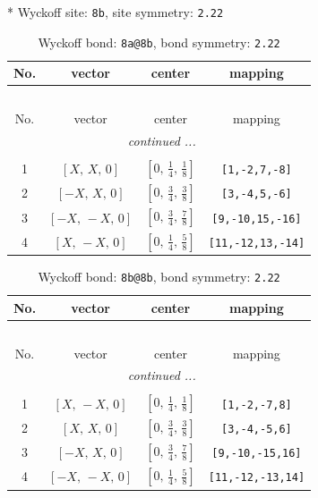 \documentclass[fleqn,8pt]{jsarticle}
\begin{document}
* Wyckoff site: {\tt 8b}, site symmetry: {\tt 2.22}
\renewcommand{\arraystretch}{1.2}
\begin{longtable}{cccc}
\caption{Wyckoff bond: {\tt 8a@8b}, bond symmetry: {\tt 2.22}}
 \\
 \hline \hline
No. & vector & center & mapping \\ \hline \endfirsthead

\multicolumn{3}{l}{\tablename\ \thetable{}} \\
 \hline \hline
No. & vector & center & mapping \\ \hline \endhead

 \hline \hline
\multicolumn{3}{r}{\footnotesize\it continued ...} \\ \endfoot

 \hline \hline
\multicolumn{3}{r}{} \\ \endlastfoot

1 & $\left[ X,\, X,\, 0 \right]$ & $\left[ 0,\, \frac{1}{4},\, \frac{1}{8} \right]$ & {\tt [1,-2,7,-8]} \\ \hline
2 & $\left[ - X,\, X,\, 0 \right]$ & $\left[ 0,\, \frac{3}{4},\, \frac{3}{8} \right]$ & {\tt [3,-4,5,-6]} \\ \hline
3 & $\left[ - X,\, - X,\, 0 \right]$ & $\left[ 0,\, \frac{3}{4},\, \frac{7}{8} \right]$ & {\tt [9,-10,15,-16]} \\ \hline
4 & $\left[ X,\, - X,\, 0 \right]$ & $\left[ 0,\, \frac{1}{4},\, \frac{5}{8} \right]$ & {\tt [11,-12,13,-14]} \\
\end{longtable}
\renewcommand{\arraystretch}{1.2}
\begin{longtable}{cccc}
\caption{Wyckoff bond: {\tt 8b@8b}, bond symmetry: {\tt 2.22}}
 \\
 \hline \hline
No. & vector & center & mapping \\ \hline \endfirsthead

\multicolumn{3}{l}{\tablename\ \thetable{}} \\
 \hline \hline
No. & vector & center & mapping \\ \hline \endhead

 \hline \hline
\multicolumn{3}{r}{\footnotesize\it continued ...} \\ \endfoot

 \hline \hline
\multicolumn{3}{r}{} \\ \endlastfoot

1 & $\left[ X,\, - X,\, 0 \right]$ & $\left[ 0,\, \frac{1}{4},\, \frac{1}{8} \right]$ & {\tt [1,-2,-7,8]} \\ \hline
2 & $\left[ X,\, X,\, 0 \right]$ & $\left[ 0,\, \frac{3}{4},\, \frac{3}{8} \right]$ & {\tt [3,-4,-5,6]} \\ \hline
3 & $\left[ - X,\, X,\, 0 \right]$ & $\left[ 0,\, \frac{3}{4},\, \frac{7}{8} \right]$ & {\tt [9,-10,-15,16]} \\ \hline
4 & $\left[ - X,\, - X,\, 0 \right]$ & $\left[ 0,\, \frac{1}{4},\, \frac{5}{8} \right]$ & {\tt [11,-12,-13,14]} \\
\end{longtable}
\end{document}
